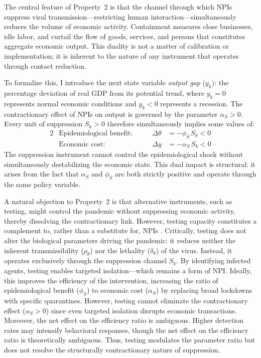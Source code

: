 \documentclass[12pt, a4paper]{article}
\newcommand{\Sk}{S_k}
\begin{document}
The central feature of Property~2 is that the channel through which NPIs suppress viral transmission---restricting human interaction---simultaneously reduces the volume of economic activity. Containment measures close businesses, idle labor, and curtail the flow of goods, services, and persons that constitutes aggregate economic output. This duality is not a matter of calibration or implementation; it is inherent to the nature of any instrument that operates through contact reduction.

To formalize this, I introduce the next state variable \textit{output gap} ($y_k$): the percentage deviation of real GDP from its potential trend, where $y_k = 0$ represents normal economic conditions and $y_k < 0$ represents a recession. The contractionary effect of NPIs on output is governed by the parameter $\alpha_S > 0$. Every unit of suppression $\Sk > 0$ therefore simultaneously implies some values of:
%
\begin{alignat}{2}
&\text{Epidemiological benefit:} &\qquad \Delta\theta &= -\phi_S \, \Sk < 0 \label{eq:S_health}\\[4pt]
&\text{Economic cost:} &\qquad \Delta y &= -\alpha_S \, \Sk < 0 \label{eq:S_econ}
\end{alignat}
%
The suppression instrument cannot control the epidemiological shock without simultaneously destabilizing the economic state. This dual impact is structural: it arises from the fact that $\alpha_S$ and $\phi_S$ are both strictly positive and operate through the same policy variable.

A natural objection to Property~2 is that alternative instruments, such as testing, might control the pandemic without suppressing economic activity, thereby dissolving the contractionary link. However, testing capacity constitutes a complement to, rather than a substitute for, NPIs \citep{repec:nbr}. Critically, testing does not alter the biological parameters driving the pandemic: it reduces neither the inherent transmissibility ($\rho_\theta$) nor the lethality ($\delta_\theta$) of the virus. Instead, it operates exclusively through the suppression channel $S_k$. By identifying infected agents, testing enables targeted isolation---which remains a form of NPI. Ideally, this improves the efficiency of the intervention, increasing the ratio of epidemiological benefit ($\phi_S$) to economic cost ($\alpha_S$) by replacing broad lockdowns with specific quarantines. However, testing cannot eliminate the contractionary effect ($\alpha_S > 0$) since even targeted isolation disrupts economic transactions. Moreover, the net effect on the efficiency ratio is ambiguous. Higher detection rates may intensify behavioral responses, though the net effect on the efficiency ratio is theoretically ambiguous. Thus, testing modulates the parameter ratio but does not resolve the structurally contractionary nature of suppression.
\end{document}
